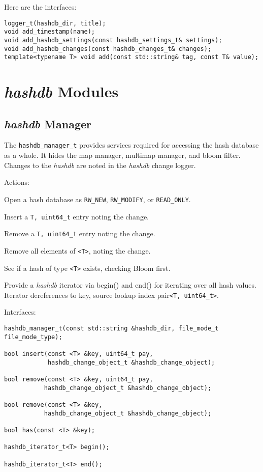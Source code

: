 \documentclass[12pt,twoside]{article}
\newcommand{\hdb}{\emph{hashdb}\xspace}
\begin{document}
Here are the interfaces:

\begin{small}
\begin{verbatim}
logger_t(hashdb_dir, title);
void add_timestamp(name);
void add_hashdb_settings(const hashdb_settings_t& settings);
void add_hashdb_changes(const hashdb_changes_t& changes);
template<typename T> void add(const std::string& tag, const T& value);
\end{verbatim}
\end{small}

\section{\hdb Modules}
\subsection{\hdb Manager}
The \texttt{hashdb\_manager\_t}
provides services required for accessing the hash database
as a whole.  It hides the map manager, multimap manager, and bloom filter.
Changes to the \hdb are noted in the \hdb change logger.

Actions:
\begin{compactitem}
\item Open a hash database as
\texttt{RW\_NEW}, \texttt{RW\_MODIFY}, or \texttt{READ\_ONLY}.
\item Insert a \texttt{T, uint64\_t} entry noting the change.
\item Remove a \texttt{T, uint64\_t} entry noting the change.
\item Remove all elements of \texttt{<T>}, noting the change.
\item See if a hash of type \texttt{<T>} exists, checking Bloom first.
\item Provide a \hdb iterator via begin() and end()
for iterating over all hash values.
Iterator dereferences to
key, source lookup index pair\texttt{<T, uint64\_t>}.
\end{compactitem}

Interfaces:

\begin{small}
\begin{verbatim}
hashdb_manager_t(const std::string &hashdb_dir, file_mode_t file_mode_type);

bool insert(const <T> &key, uint64_t pay,
            hashdb_change_object_t &hashdb_change_object);

bool remove(const <T> &key, uint64_t pay,
           hashdb_change_object_t &hashdb_change_object);

bool remove(const <T> &key,
           hashdb_change_object_t &hashdb_change_object);

bool has(const <T> &key);

hashdb_iterator_t<T> begin();

hashdb_iterator_t<T> end();
\end{verbatim}
\end{small}
\end{document}
